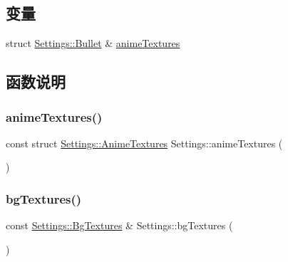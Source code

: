 \subsection*{变量}
\begin{DoxyCompactItemize}
\item 
struct \hyperlink{struct_settings_1_1_bullet}{Settings\+::\+Bullet} \& \hyperlink{namespace_settings_a60c5dfdfb55f1abb671e786f06fc24dd}{anime\+Textures}
\end{DoxyCompactItemize}


\subsection{函数说明}
\mbox{\label{namespace_settings_a106c90d315148ccd78a2d961dae148a8}} 
\subsubsection{\texorpdfstring{anime\+Textures()}{animeTextures()}}
{\footnotesize\ttfamily const struct \hyperlink{struct_settings_1_1_anime_textures}{Settings\+::\+Anime\+Textures} Settings\+::anime\+Textures (\begin{DoxyParamCaption}{ }\end{DoxyParamCaption})}

\mbox{\label{namespace_settings_a8bae923ac0d881b72bbec4f50730ec72}} 
\subsubsection{\texorpdfstring{bg\+Textures()}{bgTextures()}}
{\footnotesize\ttfamily const \hyperlink{struct_settings_1_1_bg_textures}{Settings\+::\+Bg\+Textures} \& Settings\+::bg\+Textures (\begin{DoxyParamCaption}{ }\end{DoxyParamCaption})}

\mbox{\label{namespace_settings_a77e282eadc82f97cb15c2c3eef3c535b}} 

